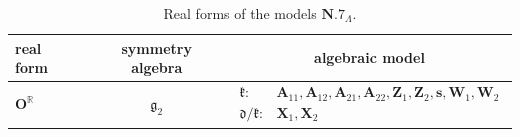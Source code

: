 \documentclass[pdftex]{sigma}
\newcommand{\bbR}{\mathbb{R}}
\newcommand{\mbA}{\mathbf{A}}
\newcommand{\mbO}{\mathbf{O}}
\newcommand{\mbs}{\mathbf{s}}
\newcommand{\mbW}{\mathbf{W}}
\newcommand{\mbX}{\mathbf{X}}
\newcommand{\mbZ}{\mathbf{Z}}
\newcommand{\mfd} {\mathfrak{d}}
\newcommand{\mfg} {\mathfrak{g}}
\newcommand{\mfk} {\mathfrak{k}}
\numberwithin{equation}{section}
\begin{document}
\begin{table}[h!]
\caption{The real form $\mbO^{\bbR}$ of model $\mbO$.}\label{table:real-O}\vspace{1mm}

\tiny
\centering
\begin{tabular}{lcl}
\toprule
 real form
 & symmetry algebra
 & \multicolumn{1}{c}{algebraic model} \\
\midrule
 $\mbO^{\bbR}$
 & $\mfg_2$
 & $\begin{array}{rl}
 \mfk\colon
 &\!\!\!\!\!\! \mbA_{11}, \mbA_{12}, \mbA_{21}, \mbA_{22}, \mbZ_1, \mbZ_2, \mbs, \mbW_1, \mbW_2 \\
	 \mfd / \mfk\colon
 &\!\!\!\!\!\! \mbX_1, \mbX_2
 \end{array}$ \\
\bottomrule
\end{tabular}

\vspace{0.8cm}

\caption{Real forms of the models $\mathbf{N.7}_{\Lambda}$.}\label{table:real-N.7}\vspace{1mm}


\end{table}
\end{document}
